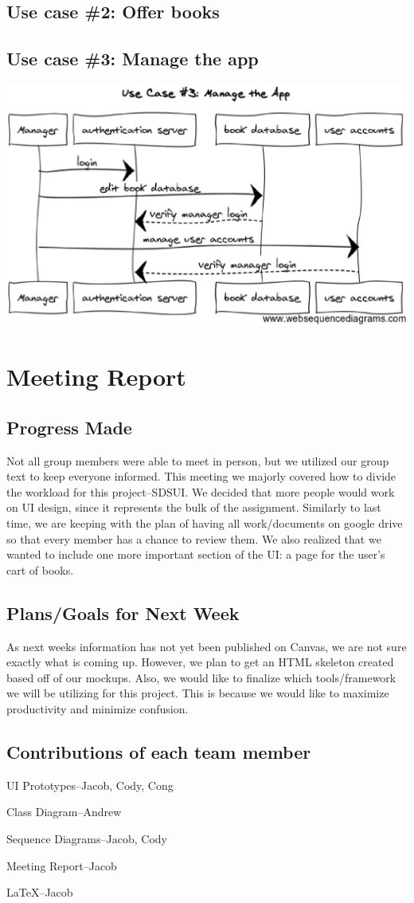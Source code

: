 \documentclass[12pt]{article}
\begin{document}
		\subsection{Use case \#2: Offer books}


		\subsection{Use case \#3: Manage the app}
		\includegraphics[width=14cm]{sequence_diagram3.eps}


	\section{Meeting Report}
		\subsection{Progress Made}
			Not all group members were able to meet in person, but we utilized our group text to keep everyone informed. 
			This meeting we majorly covered how to divide the workload for this project--SDSUI. 
			We decided that more people would work on UI design, since it represents the bulk of the assignment. 
			Similarly to last time, we are keeping with the plan of having all work/documents on google drive so that every member has a chance to review them. 
			We also realized that we wanted to include one more important section of the UI: a page for the user’s cart of books.


		\subsection{Plans/Goals for Next Week}

		As next week\textquotestingle s information has not yet been published on Canvas, we are not sure exactly what is coming up. 
		However, we plan to get an HTML skeleton created based off of our mockups. 
		Also, we would like to finalize which tools/framework we will be utilizing for this project. 
		This is because we would like to maximize productivity and minimize confusion.

		\subsection{Contributions of each team member}
		\par
		UI Prototypes--Jacob, Cody, Cong \par
		Class Diagram--Andrew \par
		Sequence Diagrams--Jacob, Cody \par
		Meeting Report--Jacob \par
		LaTeX--Jacob 
\end{document}

